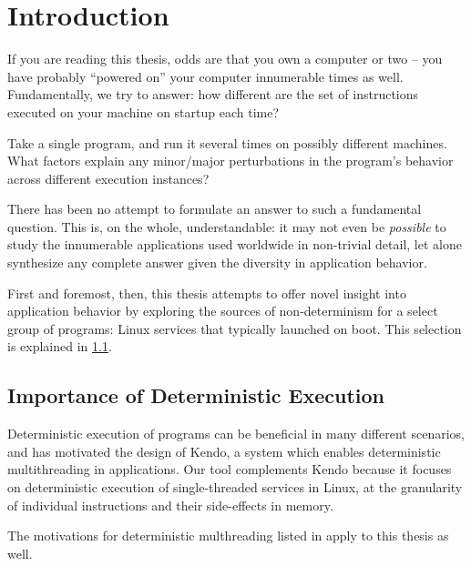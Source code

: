 \chapter{Introduction}
If you are reading this thesis, odds are that you own a computer or two 
-- you have probably ``powered on'' your computer innumerable times as well. 
Fundamentally, we try to answer: how different are the set of instructions executed
on your machine on startup each time?

Take a single program, and run it several times on possibly different machines. 
What factors explain any minor/major perturbations in the program's behavior
across different execution instances? 

There has been no attempt to formulate an answer to such a fundamental question. 
This is, on the whole, understandable: it may not even be \emph{possible} to 
study the innumerable applications used worldwide in non-trivial detail,
let alone synthesize any complete answer given the diversity in 
application behavior.

First and foremost, then, this thesis attempts 
to offer novel insight into application behavior by exploring
the sources of non-determinism for a select group
of programs: Linux services that typically launched on boot.
This selection is explained in \ref{ch1:whydeterminism}.



\section{Importance of Deterministic Execution}\label{ch1:whydeterminism}
Deterministic execution of programs can be beneficial in many
different scenarios, and has motivated the design of Kendo,
a system which enables deterministic multithreading
in applications\cite{}. Our tool complements Kendo because 
it focuses on deterministic execution of single-threaded services in Linux,
at the granularity of individual instructions and their side-effects in
memory.

The motivations for deterministic multhreading listed in
\cite{} apply to this thesis as well.

